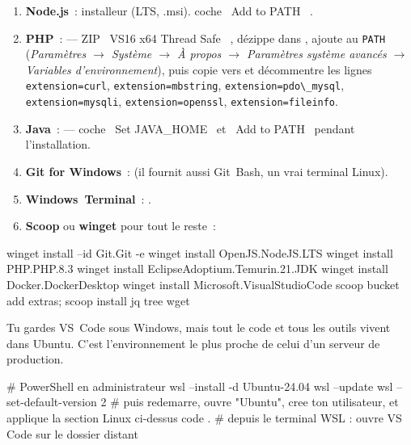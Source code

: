 \begin{enumerate}
  \item \textbf{Node.js}~: installeur 
        (LTS, .msi). coche \og ~Add to PATH~ \fg{}.
  \item \textbf{PHP}~: 
        --- ZIP \og ~VS16 x64 Thread Safe~ \fg{}, d\'ezippe dans , ajoute
         au \verb|PATH| (\emph{Param\`etres $\rightarrow$ Syst\`eme $\rightarrow$ \`A propos $\rightarrow$ Param\`etres
        syst\`eme avanc\'es $\rightarrow$ Variables d'environnement}), puis copie 
        vers  et d\'ecommentre les lignes
        \verb|extension=curl|, \verb|extension=mbstring|, \verb|extension=pdo\_mysql|,
        \verb|extension=mysqli|, \verb|extension=openssl|, \verb|extension=fileinfo|.
  \item \textbf{Java}~:  ---
        coche \og ~Set JAVA\_HOME~ \fg{} et \og ~Add to PATH~ \fg{} pendant l'installation.
  \item \textbf{Git for Windows}~: 
        (il fournit aussi Git~Bash, un vrai terminal Linux).
  \item \textbf{Windows~Terminal}~: .
  \item \textbf{Scoop} ou \textbf{winget} pour tout le reste~:
\end{enumerate}

\begin{terminal}
winget install --id Git.Git -e
winget install OpenJS.NodeJS.LTS
winget install PHP.PHP.8.3
winget install EclipseAdoptium.Temurin.21.JDK
winget install Docker.DockerDesktop
winget install Microsoft.VisualStudioCode
scoop bucket add extras; scoop install jq tree wget
\end{terminal}

Tu gardes VS~Code sous Windows, mais tout le code et tous les outils vivent dans Ubuntu.
C'est l'environnement le plus proche de celui d'un serveur de production.

\begin{terminal}
# PowerShell en administrateur
wsl --install -d Ubuntu-24.04
wsl --update
wsl --set-default-version 2
# puis redemarre, ouvre "Ubuntu", cree ton utilisateur, et applique la section Linux ci-dessus
code .        # depuis le terminal WSL : ouvre VS Code sur le dossier distant
\end{terminal}

